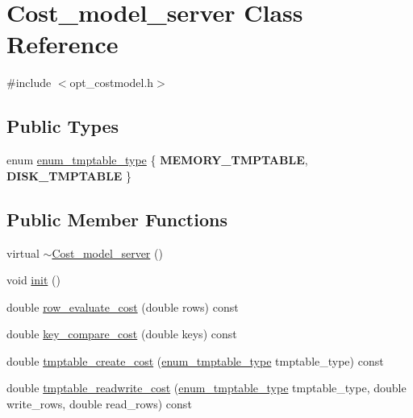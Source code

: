 \hypertarget{classCost__model__server}{}\section{Cost\+\_\+model\+\_\+server Class Reference}
\label{classCost__model__server}


{\ttfamily \#include $<$opt\+\_\+costmodel.\+h$>$}

\subsection*{Public Types}
\begin{DoxyCompactItemize}
\item 
enum \mbox{\hyperlink{classCost__model__server_a140ad6035a21dbe363f69eb4b5ea98c0}{enum\+\_\+tmptable\+\_\+type}} \{ {\bfseries M\+E\+M\+O\+R\+Y\+\_\+\+T\+M\+P\+T\+A\+B\+LE}, 
{\bfseries D\+I\+S\+K\+\_\+\+T\+M\+P\+T\+A\+B\+LE}
 \}
\end{DoxyCompactItemize}
\subsection*{Public Member Functions}
\begin{DoxyCompactItemize}
\item 
virtual \mbox{\hyperlink{classCost__model__server_a7198ad7c22a47c320d7c9c26b1189a5d}{$\sim$\+Cost\+\_\+model\+\_\+server}} ()
\item 
void \mbox{\hyperlink{classCost__model__server_a267c97e430cec8665c0c62ad722d80c1}{init}} ()
\item 
double \mbox{\hyperlink{classCost__model__server_ab1e112ce95b61d96c291af41541ff2e2}{row\+\_\+evaluate\+\_\+cost}} (double rows) const
\item 
double \mbox{\hyperlink{classCost__model__server_a8315c6b7726cc01fda328159ad6c97f5}{key\+\_\+compare\+\_\+cost}} (double keys) const
\item 
double \mbox{\hyperlink{classCost__model__server_a52f14b9994d65fe01fd7bdf1b9391470}{tmptable\+\_\+create\+\_\+cost}} (\mbox{\hyperlink{classCost__model__server_a140ad6035a21dbe363f69eb4b5ea98c0}{enum\+\_\+tmptable\+\_\+type}} tmptable\+\_\+type) const
\item 
double \mbox{\hyperlink{classCost__model__server_ad01970db22e4817c1b2e87ba70f6ec67}{tmptable\+\_\+readwrite\+\_\+cost}} (\mbox{\hyperlink{classCost__model__server_a140ad6035a21dbe363f69eb4b5ea98c0}{enum\+\_\+tmptable\+\_\+type}} tmptable\+\_\+type, double write\+\_\+rows, double read\+\_\+rows) const
\end{DoxyCompactItemize}

